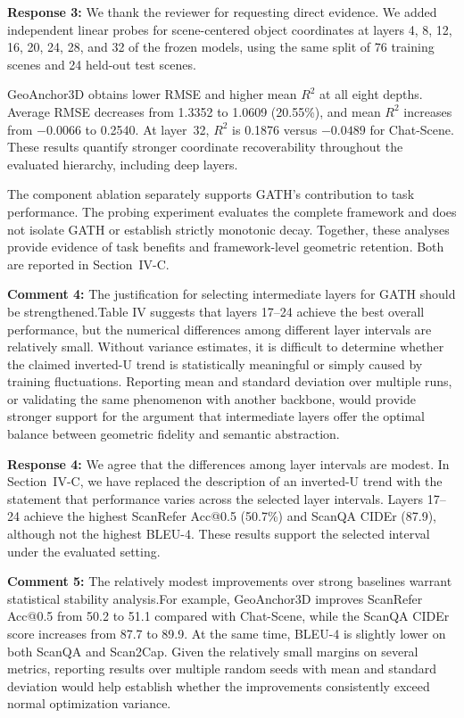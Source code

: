 \noindent\textbf{Response 3:}
We thank the reviewer for requesting direct evidence. We added independent linear probes for scene-centered object coordinates at layers 4, 8, 12, 16, 20, 24, 28, and 32 of the frozen models, using the same split of 76 training scenes and 24 held-out test scenes.

GeoAnchor3D obtains lower RMSE and higher mean $R^2$ at all eight depths. Average RMSE decreases from 1.3352 to 1.0609 (20.55\%), and mean $R^2$ increases from $-0.0066$ to 0.2540. At layer~32, $R^2$ is 0.1876 versus $-0.0489$ for Chat-Scene. These results quantify stronger coordinate recoverability throughout the evaluated hierarchy, including deep layers.

The component ablation separately supports GATH's contribution to task performance. The probing experiment evaluates the complete framework and does not isolate GATH or establish strictly monotonic decay. Together, these analyses provide evidence of task benefits and framework-level geometric retention. Both are reported in Section~IV-C.
\vspace{\resafter}


{\noindent\color{comment}
\textbf{Comment 4:}
The justification for selecting intermediate layers for GATH should be strengthened.Table IV suggests that layers 17--24 achieve the best overall performance, but the numerical differences among different layer intervals are relatively small.  Without variance estimates, it is difficult to determine whether the claimed inverted-U trend is statistically meaningful or simply caused by training fluctuations. Reporting mean and standard deviation over multiple runs, or validating the same phenomenon with another backbone, would provide stronger support for the argument that intermediate layers offer the optimal balance between geometric fidelity and semantic abstraction.
}\vspace{\comafter}

\noindent\textbf{Response 4:}
We agree that the differences among layer intervals are modest. In Section~IV-C, we have replaced the description of an inverted-U trend with the statement that performance varies across the selected layer intervals. Layers 17--24 achieve the highest ScanRefer Acc@0.5 (50.7\%) and ScanQA CIDEr (87.9), although not the highest BLEU-4. These results support the selected interval under the evaluated setting.
\vspace{\resafter}


{\noindent\color{comment}
\textbf{Comment 5:}
The relatively modest improvements over strong baselines warrant statistical stability analysis.For example, GeoAnchor3D improves ScanRefer Acc@0.5 from 50.2 to 51.1 compared with Chat-Scene, while the ScanQA CIDEr score increases from 87.7 to 89.9. At the same time, BLEU-4 is slightly lower on both ScanQA and Scan2Cap.  Given the relatively small margins on several metrics, reporting results over multiple random seeds with mean and standard deviation would help establish whether the improvements consistently exceed normal optimization variance.
}\vspace{\comafter}

